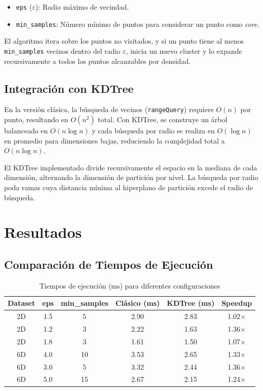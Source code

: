 \documentclass[12pt,a4paper]{article}
\begin{document}
\begin{itemize}
    \item \texttt{eps} ($\varepsilon$): Radio máximo de vecindad.
    \item \texttt{min\_samples}: Número mínimo de puntos para considerar un punto como \textit{core}.
\end{itemize}

El algoritmo itera sobre los puntos no visitados, y si un punto tiene al menos \texttt{min\_samples} vecinos dentro del radio $\varepsilon$, inicia un nuevo cluster y lo expande recursivamente a todos los puntos alcanzables por densidad.

\subsection{Integración con KDTree}
En la versión clásica, la búsqueda de vecinos (\texttt{rangeQuery}) requiere $O(n)$ por punto, resultando en $O(n^2)$ total. Con KDTree, se construye un árbol balanceado en $O(n \log n)$ y cada búsqueda por radio se realiza en $O(\log n)$ en promedio para dimensiones bajas, reduciendo la complejidad total a $O(n \log n)$.

El KDTree implementado divide recursivamente el espacio en la mediana de cada dimensión, alternando la dimensión de partición por nivel. La búsqueda por radio poda ramas cuya distancia mínima al hiperplano de partición excede el radio de búsqueda.

\section{Resultados}

\subsection{Comparación de Tiempos de Ejecución}

\begin{table}[H]
\centering
\caption{Tiempos de ejecución (ms) para diferentes configuraciones}
\begin{tabular}{cccccc}
\toprule
\textbf{Dataset} & \textbf{eps} & \textbf{min\_samples} & \textbf{Clásico (ms)} & \textbf{KDTree (ms)} & \textbf{Speedup} \\
\midrule
2D & 1.5 & 5  & 2.90 & 2.83 & 1.02$\times$ \\
2D & 1.2 & 3  & 2.22 & 1.63 & 1.36$\times$ \\
2D & 1.8 & 3  & 1.61 & 1.50 & 1.07$\times$ \\
\midrule
6D & 4.0 & 10 & 3.53 & 2.65 & 1.33$\times$ \\
6D & 3.0 & 5  & 3.32 & 2.44 & 1.36$\times$ \\
6D & 5.0 & 15 & 2.67 & 2.15 & 1.24$\times$ \\
\bottomrule
\end{tabular}
\end{table}
\end{document}
